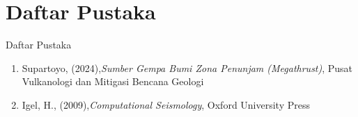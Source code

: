 \section{Daftar Pustaka}
\begin{frame}{Daftar Pustaka}
    \begin{enumerate}
        \item Supartoyo, (2024),\textit{Sumber Gempa Bumi Zona Penunjam (Megathrust)},
        Pusat Vulkanologi dan Mitigasi Bencana Geologi
        \item Igel, H., (2009),\textit{Computational Seismology}, Oxford University Press
    \end{enumerate}
    
\end{frame}